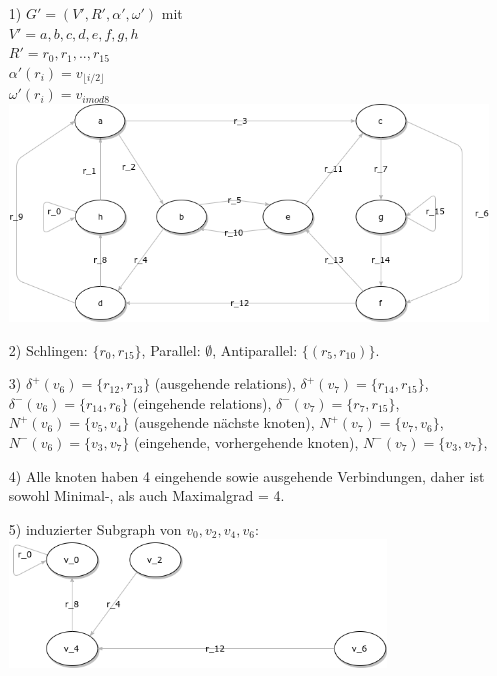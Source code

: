 \documentclass{scrartcl}
\begin{document}
\begin{itemize}
    \item[1)] $G' = (V', R', \alpha', \omega') $ mit \\
        $V' = {a, b, c, d, e, f, g, h}$ \\
        $R' = {r_0, r_1, .., r_{15}}$ \\
        $\alpha'(r_i) = v_{\lfloor i/2 \rfloor}$ \\
        $\omega'(r_i) = v_{i  mod  8}$ \\
        \includegraphics[width=14cm]{yellow_graph.png}
    \item[2)] Schlingen: $\{r_0, r_{15}\}$,
        Parallel: $\emptyset$,
        Antiparallel: $\{ (r_5, r_{10}) \}$.
    \item[3)]
        $\delta^+(v_6) = \{r_{12}, r_{13} \}$ (ausgehende relations),
        $\delta^+(v_7) = \{r_{14}, r_{15} \}$,
        $\delta^-(v_6) = \{r_{14}, r_{6} \}$ (eingehende relations),
        $\delta^-(v_7) = \{r_{7}, r_{15} \}$,
        $N^+(v_6) = \{ v_5, v_4\}$ (ausgehende nächste knoten),
        $N^+(v_7) = \{ v_7, v_6\}$,
        $N^-(v_6) = \{ v_3, v_7\}$ (eingehende, vorhergehende knoten),
        $N^-(v_7) = \{ v_3, v_7\}$,
    \item[4)] Alle knoten haben 4 eingehende sowie ausgehende Verbindungen,
        daher ist sowohl Minimal-, als auch Maximalgrad = 4.
    \item[5)] induzierter Subgraph von $v_0, v_2, v_4, v_6$: \\
        \includegraphics[width=10cm]{induced_sub_graph.png}
\end{itemize}
\end{document}
